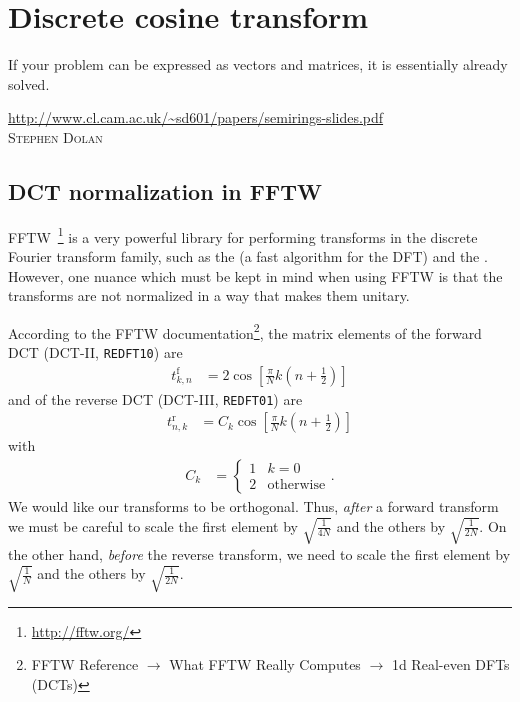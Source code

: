 \chapter{Discrete cosine transform}

\label{chap:dct}

\epigraph{
If your problem can be expressed as vectors and matrices, it is essentially already solved.
}{
\url{http://www.cl.cam.ac.uk/~sd601/papers/semirings-slides.pdf} \\
\textsc{Stephen Dolan}
}


\section{DCT normalization in FFTW}

FFTW~\cite{frigo2005design}\footnote{
	\url{http://fftw.org/}
} is a very powerful library for performing transforms in the discrete Fourier transform family, such as the  (a fast algorithm for the DFT) and the .
However, one nuance which must be kept in mind when using FFTW is that the transforms are not normalized in a way that makes them unitary.

According to the FFTW documentation\footnote{
	FFTW Reference $\to$ What FFTW Really Computes $\to$ 1d Real-even DFTs (DCTs)
}, the matrix elements of the forward DCT (DCT-II, \texttt{REDFT10}) are
\begin{align}
	t^\textrm{f}_{k,n}
	&= 2 \cos{\left[ \frac{\pi}{N} k \left( n + \frac{1}{2} \right) \right]}
\end{align}
and of the reverse DCT (DCT-III, \texttt{REDFT01}) are
\begin{align}
	t^\textrm{r}_{n,k}
	&= C_k \cos{\left[ \frac{\pi}{N} k \left( n + \frac{1}{2} \right) \right]}
\end{align}
with
\begin{align}
	C_k
	&= \begin{cases}
			1 & k = 0 \\
			2 & \text{otherwise}
		\end{cases}.
\end{align}
We would like our transforms to be orthogonal.
Thus, \emph{after} a forward transform we must be careful to scale the first element by $\sqrt{\frac{1}{4 N}}$ and the others by $\sqrt{\frac{1}{2 N}}$.
On the other hand, \emph{before} the reverse transform, we need to scale the first element by $\sqrt{\frac{1}{N}}$ and the others by $\sqrt{\frac{1}{2 N}}$.


